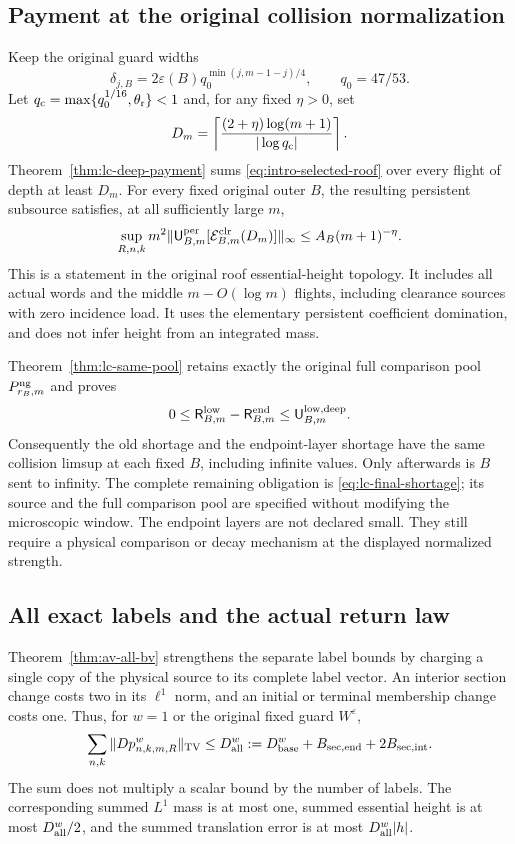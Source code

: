 \subsection*{Payment at the original collision normalization}
Keep the original guard widths
\[
 \delta_{j,B}=2\varepsilon(B)q_0^{\min(j,m-1-j)/4},
 \qquad q_0=47/53.
\]
Let $q_{\rm c}=\max\{q_0^{1/16},\theta_{\rm r}\}<1$ and,
for any fixed $\eta>0$, set
\[
 D_m=\left\lceil\frac{(2+\eta)\log(m+1)}{|\log q_{\rm c}|}
                                                \right\rceil.
\]
Theorem~\ref{thm:lc-deep-payment} sums
\eqref{eq:intro-selected-roof} over every flight of depth at
least $D_m$. For every fixed original outer $B$, the resulting
persistent subsource satisfies, at all sufficiently large $m$,
\begin{equation}\label{eq:intro-deep-payment}
 \sup_{R,n,k}m^2
 \|\mathsf U_{B,m}^{\rm per}
       [\mathcal E^{\rm clr}_{B,m}(D_m)]\|_\infty
                    \le A_B(m+1)^{-\eta}.
\end{equation}
This is a statement in the original roof essential-height
topology. It includes all actual words and the middle
$m-O(\log m)$ flights, including clearance sources with zero
incidence load. It uses the elementary persistent coefficient
domination, and does not infer height from an integrated mass.

Theorem~\ref{thm:lc-same-pool} retains exactly the original full
comparison pool $P^{\rm ng}_{r_B,m}$ and proves
\[
 0\le\mathsf R^{\rm low}_{B,m}-\mathsf R^{\rm end}_{B,m}
                  \le\mathsf U^{\rm low,deep}_{B,m}.
\]
Consequently the old shortage and the endpoint-layer shortage
have the same collision limsup at each fixed $B$, including
infinite values. Only afterwards is $B$ sent to infinity.
The complete remaining obligation is
\eqref{eq:lc-final-shortage}; its source and the full comparison
pool are specified without modifying the microscopic window.
The endpoint layers are not declared small. They still require
a physical comparison or decay mechanism at the displayed
normalized strength.

\subsection*{All exact labels and the actual return law}
Theorem~\ref{thm:av-all-bv} strengthens the separate label bounds
by charging a single copy of the physical source to its complete
label vector. An interior section change costs two in its
$\ell^1$ norm, and an initial or terminal membership change costs
one. Thus, for $w=1$ or the original fixed guard $W^\varepsilon$,
\begin{equation}\label{eq:intro-all-labels}
 \sum_{n,k}\|Dp^w_{n,k,m,R}\|_{\rm TV}
    \le D_{\rm all}^w
    :=D_{\rm base}^w+B_{\rm sec,end}+2B_{\rm sec,int}.
\end{equation}
The sum does not multiply a scalar bound by the number of labels.
The corresponding summed $L^1$ mass is at most one, summed
essential height is at most $D_{\rm all}^w/2$, and the summed
translation error is at most $D_{\rm all}^w|h|$.

